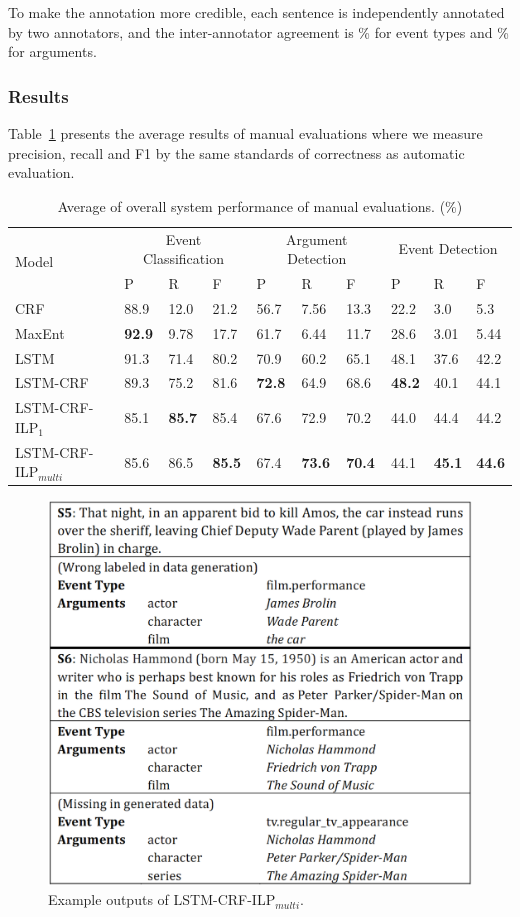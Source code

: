 \documentclass{article}
\begin{document}
To make the annotation more credible, each sentence is independently annotated by two annotators, and the inter-annotator agreement is \% for event types and \% for arguments.

\subsubsection{Results}
Table~\ref{tab:2} presents the average results of manual evaluations where we measure precision, recall and F1 by the same standards of correctness as automatic evaluation.  

\begin{table}[t]
\centering
\begin{tabular}{|l|p{0.8cm}<{\centering}|p{0.8cm}<{\centering}|p{0.8cm}<{\centering}|p{0.8cm}<{\centering}|p{0.8cm}<{\centering}|p{0.8cm}<{\centering}|p{0.8cm}<{\centering}|p{0.8cm}<{\centering}|p{0.8cm}<{\centering}|} \hline
	\multirow{2}{*}{Model} & \multicolumn{3}{c|}{Event Classification} & \multicolumn{3}{c|}{Argument Detection} & 
	\multicolumn{3}{c|}{Event Detection} \\ \cline{2-10}
	 & P & R & F & P & R & F & P & R & F \\ \hline
	CRF & 88.9 & 12.0 & 21.2 & 56.7 & 7.56 & 13.3 & 22.2 & 3.0 & 5.3 \\ \hline
	MaxEnt & \textbf{92.9} & 9.78 & 17.7 & 61.7 & 6.44 & 11.7 & 28.6 & 3.01 & 5.44 \\ \hline
	LSTM & 91.3 & 71.4 & 80.2 & 70.9 & 60.2 & 65.1 & 48.1 & 37.6 & 42.2 \\ \hline \hline
	LSTM-CRF & 89.3 & 75.2 & 81.6 & \textbf{72.8} & 64.9 & 68.6 & \textbf{48.2} & 40.1 & 44.1  \\ \hline
	LSTM-CRF-ILP$_{1}$ & 85.1 & \textbf{85.7} & 85.4 & 67.6 & 72.9 & 70.2 & 44.0 & 44.4 & 44.2 \\ \hline
	LSTM-CRF-ILP$_{multi}$ & 85.6 & 86.5 & \textbf{85.5} & 67.4 & \textbf{73.6} & \textbf{70.4} & 44.1 & \textbf{45.1} & \textbf{44.6} \\ \hline
\end{tabular}
\caption{Average of overall system performance of manual evaluations. (\%) \label{tab:2}}
\end{table}

\begin{figure}[h]
	\centering
	\includegraphics[width=.45\textwidth]{example.eps}
	\caption{Example outputs of LSTM-CRF-ILP$_{multi}$.\label{fig:1}}
\end{figure}
\end{document}
